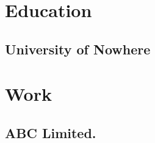 \documentclass{my_cv}
\begin{document}
\section{Education}
\subsection{University of Nowhere}
\section{Work}
\subsection{ABC Limited.}
\end{document}
